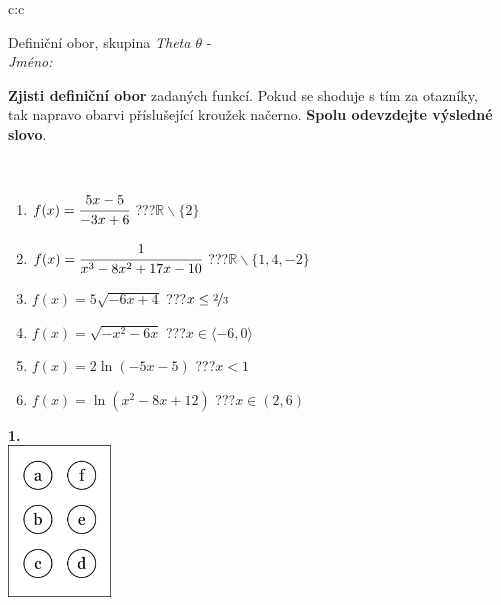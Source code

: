 \documentclass[10pt]{report}
\begin{document}
\begin{tabular}{c:c}
\begin{minipage}[c][104.5mm][t]{0.5\linewidth}
\begin{center}
\vspace{7mm}
{\huge Definiční obor, skupina \textit{Theta $\theta$} -}\\[5mm]
\textit{Jméno:}\phantom{xxxxxxxxxxxxxxxxxxxxxxxxxxxxxxxxxxxxxxxxxxxxxxxxxxxxxxxxxxxxxxxxx}\\[5mm]
\begin{minipage}{0.95\linewidth}
\begin{center}
\textbf{Zjisti definiční obor} zadaných funkcí. Pokud se shoduje s tím za otazníky,\\tak napravo obarvi příslušející kroužek načerno. \textbf{Spolu odevzdejte výsledné slovo}.
\end{center}
\end{minipage}
\\[1mm]
\begin{minipage}{0.79\linewidth}
\begin{center}
\begin{varwidth}{\linewidth}
\begin{enumerate}
\normalsizerrr
\item $f(x)=\cfrac{5x-5}{-3x+6}$\quad \dotfill\; ???\;\dotfill \quad $\mathbb{R}\smallsetminus\{2\}$
\item $f(x)=\cfrac{1}{x^3-8x^2+17x-10}$\quad \dotfill\; ???\;\dotfill \quad $\mathbb{R}\smallsetminus\{1,4,-2\}$
\item $f(x)=5\sqrt{-6x+4}$\quad \dotfill\; ???\;\dotfill \quad $x\leq\nicefrac{2}{3}$
\item $f(x)=\sqrt{-x^2-6x}$\quad \dotfill\; ???\;\dotfill \quad $x\in\langle-6 , 0\rangle$
\item $f(x)=2\ln{(-5x-5)}$\quad \dotfill\; ???\;\dotfill \quad $x<1$
\item $f(x)=\ln{(x^2-8x+12)}$\quad \dotfill\; ???\;\dotfill \quad $x\in(2 , 6)$
\end{enumerate}
\end{varwidth}
\end{center}
\end{minipage}
\begin{minipage}{0.20\linewidth}
\begin{center}
{\Huge\bfseries 1.} \\[2mm]
\includegraphics[height=40mm]{../images/braille.png}

\end{center}
\end{minipage}
\end{center}
\end{minipage}
\end{tabular}
\end{document}
